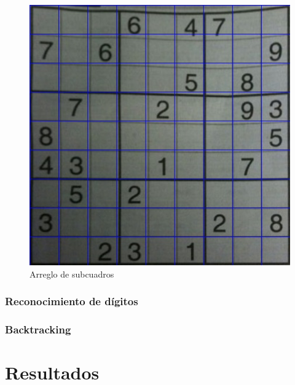 \documentclass{article}
\begin{document}
\begin{figure}[H]
\caption{Arreglo de subcuadros}
\centering
\includegraphics[width=.8\textwidth]{squares}
\end{figure}

\subsubsection{Reconocimiento de dígitos}
\subsubsection{Backtracking}
\section{Resultados}


    
\end{document}
